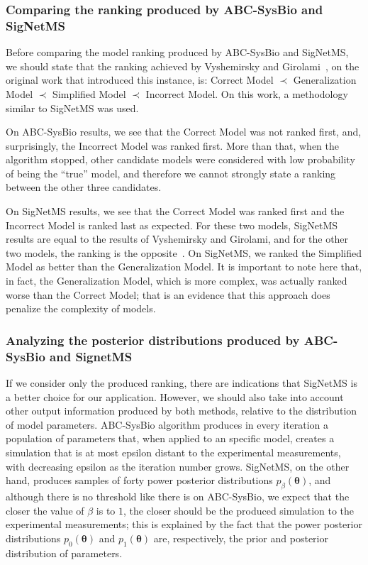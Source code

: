 \subsubsection{Comparing the ranking produced by ABC-SysBio and SigNetMS}
Before comparing the model ranking produced by ABC-SysBio and SigNetMS,
we should state that the ranking achieved by Vyshemirsky and 
Girolami~\cite{Vyshemirsky2007}, on the original work that introduced
this instance, is: Correct Model $\prec$ Generalization Model $\prec$
Simplified Model $\prec$ Incorrect Model. On this work, a methodology
similar to SigNetMS was used.

On ABC-SysBio results, we see that the Correct Model was not ranked
first, and, surprisingly, the Incorrect Model was ranked first. More
than that, when the algorithm stopped, other candidate models were
considered with low probability of being the ``true'' model, and
therefore we cannot strongly state a ranking between the other three
candidates.

On SigNetMS results, we see that the Correct Model was ranked first and 
the Incorrect Model is ranked last as expected. For these two models,
SigNetMS results are equal to the results of Vyshemirsky and Girolami,
and for the other two models, the ranking is the opposite~\cite{Vyshemirsky2007}. On SigNetMS,
we ranked the Simplified Model as better than the Generalization Model.
It is important to note here that, in fact, the Generalization Model,
which is more complex, was actually ranked worse than the Correct Model;
that is an evidence that this approach does penalize the complexity of
models.

\subsubsection{Analyzing the posterior distributions produced by
ABC-SysBio and SignetMS}
If we consider only the produced ranking, there are indications that 
SigNetMS is a better choice for our application. However, we should also
take into account other output information produced by both methods, 
relative to the distribution of model parameters. ABC-SysBio algorithm 
produces in every iteration a population of parameters that, when 
applied to an specific model, creates a simulation that is at most 
epsilon distant to the experimental measurements, with decreasing 
epsilon as the iteration number grows. SigNetMS, on the other hand, 
produces samples of forty power posterior distributions 
$p_\beta({\bm \theta})$, and although there is no threshold like there 
is on ABC-SysBio, we expect that the closer the value of $\beta$ is to 
$1$, the closer should be the produced simulation to the experimental 
measurements; this is explained by the fact that the power posterior 
distributions $p_0({\bm \theta})$ and $p_1({\bm \theta})$ are, 
respectively, the prior and posterior distribution of parameters.

